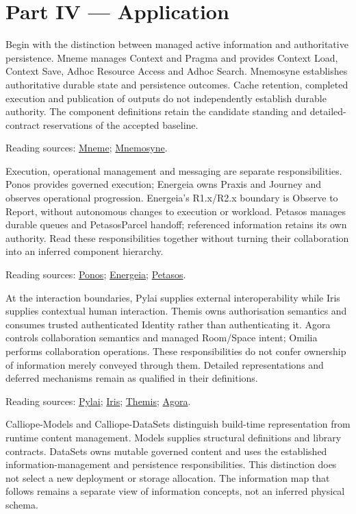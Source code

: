 \part*{Part IV — Application}
\label{navigation:IV}
Begin with the distinction between managed active information and authoritative persistence. Mneme manages Context and Pragma and provides Context Load, Context Save, Adhoc Resource Access and Adhoc Search. Mnemosyne establishes authoritative durable state and persistence outcomes. Cache retention, completed execution and publication of outputs do not independently establish durable authority. The component definitions retain the candidate standing and detailed-contract reservations of the accepted baseline.

{\small Reading sources: \hyperref[element:1af8a56358f7429fabfb57be66542a99]{Mneme}; \hyperref[element:7985e647bf9e4ca3ba70faf9e3e4ae02]{Mnemosyne}.}\par
Execution, operational management and messaging are separate responsibilities. Ponos provides governed execution; Energeia owns Praxis and Journey and observes operational progression. Energeia's R1.x/R2.x boundary is Observe to Report, without autonomous changes to execution or workload. Petasos manages durable queues and PetasosParcel handoff; referenced information retains its own authority. Read these responsibilities together without turning their collaboration into an inferred component hierarchy.

{\small Reading sources: \hyperref[element:b521762c1ea444b48cd5f66be3752d30]{Ponos}; \hyperref[element:fb3f37a6ac614415ac486a6de9d35994]{Energeia}; \hyperref[element:195e5f10db8e419391354197b5d7a8cc]{Petasos}.}\par
At the interaction boundaries, Pylai supplies external interoperability while Iris supplies contextual human interaction. Themis owns authorisation semantics and consumes trusted authenticated Identity rather than authenticating it. Agora controls collaboration semantics and managed Room/Space intent; Omilia performs collaboration operations. These responsibilities do not confer ownership of information merely conveyed through them. Detailed representations and deferred mechanisms remain as qualified in their definitions.

{\small Reading sources: \hyperref[element:e3e4147fea3640198dc251ed41ee854d]{Pylai}; \hyperref[element:e927c1af96c64fcd979be659bee2cbe3]{Iris}; \hyperref[element:899d34ec491948b68aad09e507dea6d1]{Themis}; \hyperref[element:d1c4053e68384080b8eb79d2008632ba]{Agora}.}\par
Calliope-Models and Calliope-DataSets distinguish build-time representation from runtime content management. Models supplies structural definitions and library contracts. DataSets owns mutable governed content and uses the established information-management and persistence responsibilities. This distinction does not select a new deployment or storage allocation. The information map that follows remains a separate view of information concepts, not an inferred physical schema.

